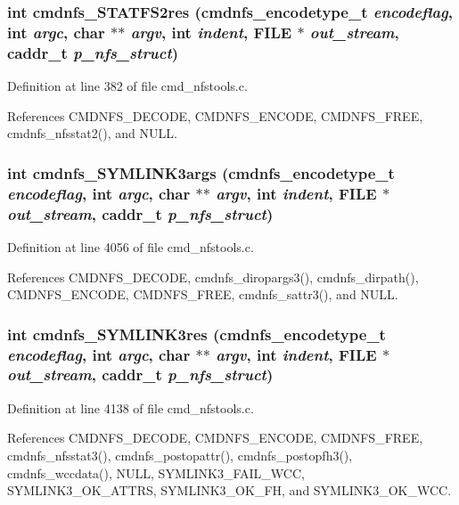 \subsubsection{\setlength{\rightskip}{0pt plus 5cm}int cmdnfs\_\-STATFS2res ({\bf cmdnfs\_\-encodetype\_\-t} {\em encodeflag}, int {\em argc}, char $\ast$$\ast$ {\em argv}, int {\em indent}, FILE $\ast$ {\em out\_\-stream}, caddr\_\-t {\em p\_\-nfs\_\-struct})}\label{cmd__nfstools_8h_a67}




Definition at line 382 of file cmd\_\-nfstools.c.

References CMDNFS\_\-DECODE, CMDNFS\_\-ENCODE, CMDNFS\_\-FREE, cmdnfs\_\-nfsstat2(), and NULL.
\subsubsection{\setlength{\rightskip}{0pt plus 5cm}int cmdnfs\_\-SYMLINK3args ({\bf cmdnfs\_\-encodetype\_\-t} {\em encodeflag}, int {\em argc}, char $\ast$$\ast$ {\em argv}, int {\em indent}, FILE $\ast$ {\em out\_\-stream}, caddr\_\-t {\em p\_\-nfs\_\-struct})}\label{cmd__nfstools_8h_a62}




Definition at line 4056 of file cmd\_\-nfstools.c.

References CMDNFS\_\-DECODE, cmdnfs\_\-diropargs3(), cmdnfs\_\-dirpath(), CMDNFS\_\-ENCODE, CMDNFS\_\-FREE, cmdnfs\_\-sattr3(), and NULL.
\subsubsection{\setlength{\rightskip}{0pt plus 5cm}int cmdnfs\_\-SYMLINK3res ({\bf cmdnfs\_\-encodetype\_\-t} {\em encodeflag}, int {\em argc}, char $\ast$$\ast$ {\em argv}, int {\em indent}, FILE $\ast$ {\em out\_\-stream}, caddr\_\-t {\em p\_\-nfs\_\-struct})}\label{cmd__nfstools_8h_a63}




Definition at line 4138 of file cmd\_\-nfstools.c.

References CMDNFS\_\-DECODE, CMDNFS\_\-ENCODE, CMDNFS\_\-FREE, cmdnfs\_\-nfsstat3(), cmdnfs\_\-postopattr(), cmdnfs\_\-postopfh3(), cmdnfs\_\-wccdata(), NULL, SYMLINK3\_\-FAIL\_\-WCC, SYMLINK3\_\-OK\_\-ATTRS, SYMLINK3\_\-OK\_\-FH, and SYMLINK3\_\-OK\_\-WCC.
